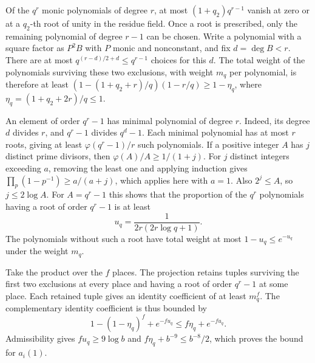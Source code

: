 Of the \(q^r\) monic polynomials of degree \(r\), at most
\((1+q_2)q^{r-1}\) vanish at zero or at a \(q_2\)-th root of unity in the
residue field. Once a root is prescribed, only the remaining polynomial
of degree \(r-1\) can be chosen. Write a polynomial with a square factor
as \(P^2B\) with \(P\) monic and nonconstant, and fix \(d=\deg B<r\).
There are at most \(q^{(r-d)/2+d}\le q^{r-1}\) choices for this \(d\).
The total weight of the polynomials surviving these two exclusions,
with weight \(m_q\) per polynomial, is therefore at least
\((1-(1+q_2+r)/q)(1-r/q)\ge1-\eta_q\), where
\(\eta_q=(1+q_2+2r)/q\le1\).

An element of order \(q^r-1\) has minimal polynomial of degree \(r\).
Indeed, its degree \(d\) divides \(r\), and \(q^r-1\) divides \(q^d-1\).
Each minimal polynomial has at most \(r\) roots, giving at least
\(\varphi(q^r-1)/r\) such polynomials.
If a positive integer \(A\) has \(j\) distinct prime divisors, then
\(\varphi(A)/A\ge1/(1+j)\). For \(j\) distinct integers exceeding \(a\),
removing the least one and applying induction gives
\(\prod_p(1-p^{-1})\ge a/(a+j)\), which applies here with \(a=1\).
Also \(2^j\le A\), so \(j\le2\log A\).
For \(A=q^r-1\) this shows that the proportion of the \(q^r\) polynomials
having a root of order \(q^r-1\) is at least
\[
 u_q=\frac{1}{2r(2r\log q+1)}.
\]
The polynomials without such a root have total weight at most
\(1-u_q\le e^{-u_q}\) under the weight \(m_q\).

Take the product over the \(f\) places. The projection retains tuples
surviving the first two exclusions at every place and having a root of
order \(q^r-1\) at some place. Each retained tuple gives an identity
coefficient of at least \(m_q^f\). The complementary identity
coefficient is thus bounded by
\[
 1-(1-\eta_q)^f+e^{-fu_q}\le f\eta_q+e^{-fu_q}.
\]
Admissibility gives \(fu_q\ge9\log b\) and \(f\eta_q+b^{-9}\le b^{-8}/2\),
which proves the bound for \(a_i(1)\).

